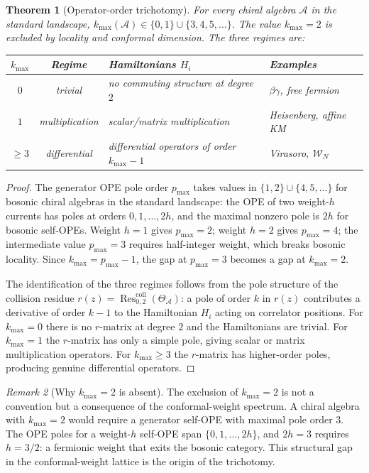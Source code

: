 \documentclass[11pt]{article}
\newtheorem{theorem}{Theorem}[section]
\theoremstyle{definition}
\theoremstyle{remark}
\newtheorem{remark}[theorem]{Remark}
\newcommand{\cA}{\mathcal{A}}
\newcommand{\Walg}{\mathcal{W}}
\newcommand{\Res}{\operatorname{Res}}
\numberwithin{equation}{section}
\begin{document}
\begin{theorem}[Operator-order trichotomy]\label{thm:trichotomy}
For every chiral algebra $\cA$ in the standard landscape,
$k_{\max}(\cA) \in \{0,1\} \cup \{3,4,5,\ldots\}$.
The value $k_{\max} = 2$ is excluded by locality and conformal
dimension. The three regimes are:
\begin{center}
\renewcommand{\arraystretch}{1.2}
\begin{tabular}{@{}ccll@{}}
\toprule
$k_{\max}$ & \textbf{Regime} & \textbf{Hamiltonians $H_i$}
 & \textbf{Examples}\\
\midrule
$0$ & trivial & no commuting structure at degree $2$
 & $\beta\gamma$, free fermion\\
$1$ & multiplication & scalar/matrix multiplication
 & Heisenberg, affine KM\\
$\geq 3$ & differential & differential operators of order $k_{\max}-1$
 & Virasoro, $\Walg_N$\\
\bottomrule
\end{tabular}
\end{center}
\end{theorem}

\begin{proof}
The generator OPE pole order $p_{\max}$ takes values in
$\{1,2\} \cup \{4,5,\ldots\}$ for bosonic chiral algebras in the
standard landscape: the OPE of two weight-$h$ currents has poles at
orders $0, 1, \ldots, 2h$, and the maximal nonzero pole is $2h$ for
bosonic self-OPEs. Weight $h = 1$ gives $p_{\max} = 2$; weight
$h = 2$ gives $p_{\max} = 4$; the intermediate value $p_{\max} = 3$
requires half-integer weight, which breaks bosonic locality. Since
$k_{\max} = p_{\max} - 1$, the gap at $p_{\max} = 3$ becomes a gap at
$k_{\max} = 2$.

The identification of the three regimes follows from the pole structure
of the collision residue $r(z) = \Res^{\mathrm{coll}}_{0,2}(\Theta_\cA)$:
a pole of order $k$ in $r(z)$ contributes a derivative of order $k - 1$
to the Hamiltonian $H_i$ acting on correlator positions. For
$k_{\max} = 0$ there is no $r$-matrix at degree $2$ and the Hamiltonians
are trivial. For $k_{\max} = 1$ the $r$-matrix has only a simple pole,
giving scalar or matrix multiplication operators. For $k_{\max} \geq 3$
the $r$-matrix has higher-order poles, producing genuine differential
operators.
\end{proof}

\begin{remark}[Why $k_{\max} = 2$ is absent]\label{rem:gap}
The exclusion of $k_{\max} = 2$ is not a convention but a consequence
of the conformal-weight spectrum. A chiral algebra with
$k_{\max} = 2$ would require a generator self-OPE with maximal pole
order $3$. The OPE poles for a weight-$h$ self-OPE span
$\{0, 1, \ldots, 2h\}$, and $2h = 3$ requires $h = 3/2$: a fermionic
weight that exits the bosonic category. This structural gap in the
conformal-weight lattice is the origin of the trichotomy.
\end{remark}
\end{document}
